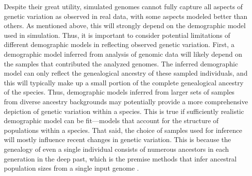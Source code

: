 \documentclass[hidelinks]{article}
\begin{document}
Despite their great utility, simulated genomes cannot fully
capture all aspects of genetic variation as observed in real data,
with some aspects modeled better than others.
As mentioned above, this will strongly depend on the demographic model used in simulation.
Thus, it is important to consider potential limitations of different demographic models
in reflecting observed genetic variation.
First, a demographic model inferred from analysis of genomic data will likely depend on
the samples that contributed the analyzed genomes.
The inferred demographic model can only reflect the genealogical ancestry
of these sampled individuals, and this will typically make up a small portion
of the complete genealogical ancestry of the species.
Thus, demographic models inferred from larger sets of samples from diverse ancestry backgrounds
may potentially provide a more comprehensive depiction of genetic variation within a species.
This is true if sufficiently realistic demographic model can be fit---models that account for the structure of populations within a species.
That said, the choice of samples used for inference will mostly influence
recent changes in genetic variation.
This is because the genealogy of even a single individual consists of numerous ancestors
in each generation in the deep past,
which is the premise methods that infer ancestral population sizes from a single input genome
\citep{LiDurbin2011}.
\end{document}
